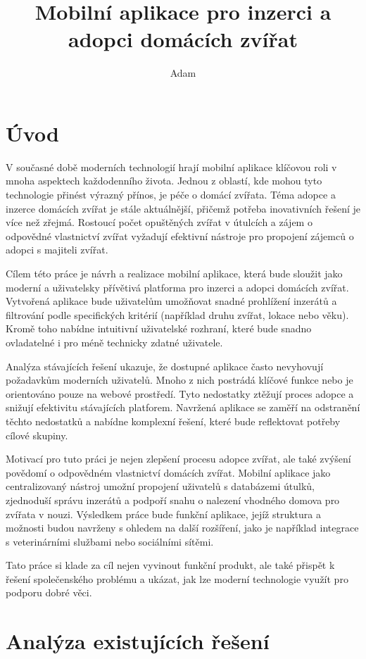 \documentclass[czech, bp, kiv, he, iso690numb, pdf]{fasthesis}
\title{Mobilní aplikace pro inzerci a adopci domácích zvířat}
\author{Adam}{Míka}{}{}
\begin{document}
    \frontpages[tm]
    \tableofcontents

    \chapter{Úvod}
    V současné době moderních technologií hrají mobilní aplikace klíčovou roli v mnoha aspektech každodenního života. Jednou z oblastí, kde mohou tyto technologie přinést výrazný přínos, je péče o domácí zvířata. Téma adopce a inzerce domácích zvířat je stále aktuálnější, přičemž potřeba inovativních řešení je více než zřejmá. Rostoucí počet opuštěných zvířat v útulcích a zájem o odpovědné vlastnictví zvířat vyžadují efektivní nástroje pro propojení zájemců o adopci s majiteli zvířat.

    Cílem této práce je návrh a realizace mobilní aplikace, která bude sloužit jako moderní a uživatelsky přívětivá platforma pro inzerci a adopci domácích zvířat. Vytvořená aplikace bude uživatelům umožňovat snadné prohlížení inzerátů a filtrování podle specifických kritérií (například druhu zvířat, lokace nebo věku). Kromě toho nabídne intuitivní uživatelské rozhraní, které bude snadno ovladatelné i pro méně technicky zdatné uživatele.

    Analýza stávajících řešení ukazuje, že dostupné aplikace často nevyhovují požadavkům moderních uživatelů. Mnoho z nich postrádá klíčové funkce nebo je orientováno pouze na webové prostředí. Tyto nedostatky ztěžují proces adopce a snižují efektivitu stávajících platforem. Navržená aplikace se zaměří na odstranění těchto nedostatků a nabídne komplexní řešení, které bude reflektovat potřeby cílové skupiny.

    Motivací pro tuto práci je nejen zlepšení procesu adopce zvířat, ale také zvýšení povědomí o odpovědném vlastnictví domácích zvířat. Mobilní aplikace jako centralizovaný nástroj umožní propojení uživatelů s databázemi útulků, zjednoduší správu inzerátů a podpoří snahu o nalezení vhodného domova pro zvířata v nouzi. Výsledkem práce bude funkční aplikace, jejíž struktura a možnosti budou navrženy s ohledem na další rozšíření, jako je například integrace s veterinárními službami nebo sociálními sítěmi.

    Tato práce si klade za cíl nejen vyvinout funkční produkt, ale také přispět k řešení společenského problému a ukázat, jak lze moderní technologie využít pro podporu dobré věci.

    \chapter{Analýza existujících řešení}
\end{document}
